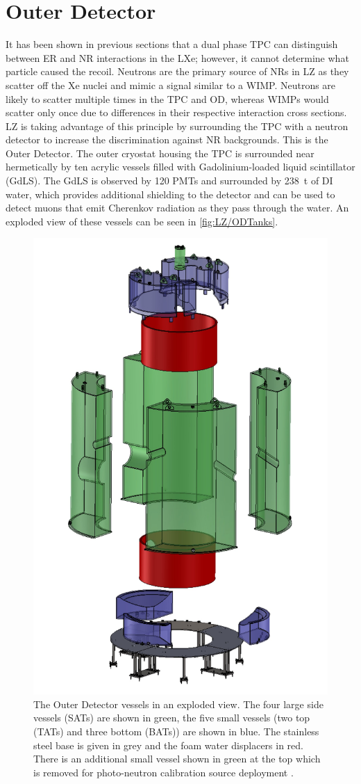 \section{Outer Detector}\label{sec:LZ/LZOD}
It has been shown in previous sections that a dual phase TPC can distinguish between ER and NR interactions in the LXe; however, it cannot determine what particle caused the recoil. Neutrons are the primary source of NRs in LZ as they scatter off the Xe nuclei and mimic a signal similar to a WIMP. Neutrons are likely to scatter multiple times in the TPC and OD, whereas WIMPs would scatter only once due to differences in their respective interaction cross sections. LZ is taking advantage of this principle by surrounding the TPC with a neutron detector to increase the discrimination against NR backgrounds. This is the Outer Detector.
The outer cryostat housing the TPC is surrounded near hermetically by ten acrylic vessels filled with Gadolinium-loaded liquid scintillator (GdLS). The GdLS is observed by 120 PMTs and surrounded by 238~t of DI water, which provides additional shielding to the detector and can be used to detect muons that emit Cherenkov radiation as they pass through the water. An exploded view of these vessels can be seen in \autoref{fig:LZ/ODTanks}.
\begin{figure}[!ht]
    \centering
    \includegraphics[width=0.5\linewidth]{figures/LZ/CAD_ODTanks.jpg}
    \caption[The LZ Outer Detector vessels in an exploded view.]{The Outer Detector vessels in an exploded view. The four large side vessels (SATs) are shown in green, the five small vessels (two top (TATs) and three bottom (BATs)) are shown in blue. The stainless steel base is given in grey and the foam water displacers in red. There is an additional small vessel shown in green at the top which is removed for photo-neutron calibration source deployment \cite{LZNIMA}.}
    \label{fig:LZ/ODTanks}
\end{figure}

